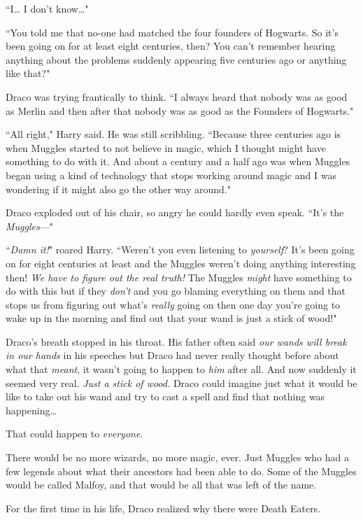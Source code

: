 ``I{\ldots} I don't know{\ldots}"

``You told me that no-one had matched the four founders of Hogwarts. So it's been going on for at least eight centuries, then? You can't remember hearing anything about the problems suddenly appearing five centuries ago or anything like that?"

Draco was trying frantically to think. ``I always heard that nobody was as good as Merlin and then after that nobody was as good as the Founders of Hogwarts."

``All right," Harry said. He was still scribbling. ``Because three centuries ago is when Muggles started to not believe in magic, which I thought might have something to do with it. And about a century and a half ago was when Muggles began using a kind of technology that stops working around magic and I was wondering if it might also go the other way around."

Draco exploded out of his chair, so angry he could hardly even speak. ``It's the \emph{Muggles}—"

``\emph{Damn it!}" roared Harry. ``Weren't you even listening to \emph{yourself}? It's been going on for eight centuries at least and the Muggles weren't doing anything interesting then! \emph{We have to figure out the real truth!} The Muggles \emph{might} have something to do with this but if they \emph{don't} and you go blaming everything on them and that stops us from figuring out what's \emph{really} going on then one day you're going to wake up in the morning and find out that your wand is just a stick of wood!"

Draco's breath stopped in his throat. His father often said \emph{our wands will break in our hands} in his speeches but Draco had never really thought before about what that \emph{meant}, it wasn't going to happen to \emph{him} after all. And now suddenly it seemed very real. \emph{Just a stick of wood.} Draco could imagine just what it would be like to take out his wand and try to cast a spell and find that nothing was happening{\ldots}

That could happen to \emph{everyone}.

There would be no more wizards, no more magic, ever. Just Muggles who had a few legends about what their ancestors had been able to do. Some of the Muggles would be called Malfoy, and that would be all that was left of the name.

For the first time in his life, Draco realized why there were Death Eaters.

